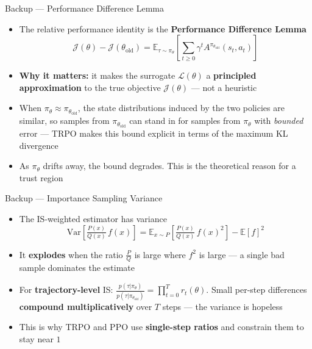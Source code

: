\begin{frame}{Backup --- Performance Difference Lemma}
\begin{itemize}
    \item The relative performance identity is the \textbf{Performance Difference Lemma}\footnotemark[1]
    $$\mathcal{J}(\theta) - \mathcal{J}(\theta_\text{old}) = \mathbb{E}_{\tau \sim \pi_\theta}\!\left[\sum_{t \geq 0} \gamma^t A^{\pi_{\theta_\text{old}}}(s_t, a_t)\right]$$
    \item \textbf{Why it matters:} it makes the surrogate $\mathcal{L}(\theta)$ a \textbf{principled approximation} to the true objective $\mathcal{J}(\theta)$ --- not a heuristic
    \item When $\pi_\theta \approx \pi_{\theta_\text{old}}$, the state distributions induced by the two policies are similar, so samples from $\pi_{\theta_\text{old}}$ can stand in for samples from $\pi_\theta$ with \emph{bounded} error --- TRPO makes this bound explicit in terms of the maximum KL divergence
    \item As $\pi_\theta$ drifts away, the bound degrades. This is the theoretical reason for a trust region
\end{itemize}
\end{frame}

\begin{frame}{Backup --- Importance Sampling Variance}
\begin{itemize}
    \item The IS-weighted estimator has variance
    $$\mathrm{Var}\!\left[\tfrac{P(x)}{Q(x)}\, f(x)\right] = \mathbb{E}_{x \sim P}\!\left[\tfrac{P(x)}{Q(x)}\, f(x)^2\right] - \mathbb{E}[f]^2$$
    \item It \textbf{explodes} when the ratio $\tfrac{P}{Q}$ is large where $f^2$ is large --- a single bad sample dominates the estimate
    \item For \textbf{trajectory-level} IS: $\frac{p(\tau|\pi_\theta)}{p(\tau|\pi_{\theta_\text{old}})} = \prod_{t=0}^{T} r_t(\theta)$. Small per-step differences \textbf{compound multiplicatively} over $T$ steps --- the variance is hopeless
    \item This is why TRPO and PPO use \textbf{single-step ratios} and constrain them to stay near $1$\footnotemark[2]
\end{itemize}
\end{frame}
